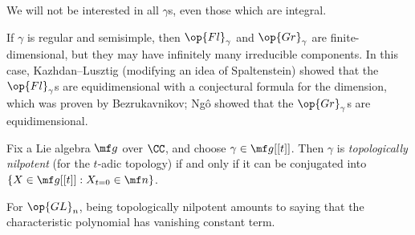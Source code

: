 \documentclass[../notes.tex]{subfiles}
\begin{document}
We will not be interested in all $\gamma$s, even those which are integral.
\begin{remark}
	If $\gamma$ is regular and semisimple, then $\op{Fl}_\gamma$ and $\op{Gr}_\gamma$ are finite-dimensional, but they may have infinitely many irreducible components. In this case, Kazhdan--Lusztig (modifying an idea of Spaltenstein) showed that the $\op{Fl}_\gamma$s are equidimensional with a conjectural formula for the dimension, which was proven by Bezrukavnikov; Ng\^o showed that the $\op{Gr}_\gamma$s are equidimensional.
\end{remark}
\begin{definition}
	Fix a Lie algebra $\mf g$ over $\CC$, and choose $\gamma\in\mf g[[t]]$. Then $\gamma$ is \textit{topologically nilpotent} (for the $t$-adic topology) if and only if it can be conjugated into $\{X\in\mf g[[t]]:X_{t=0}\in\mf n\}$.
\end{definition}
\begin{example}
	For $\op{GL}_n$, being topologically nilpotent amounts to saying that the characteristic polynomial has vanishing constant term.
\end{example}
\end{document}
